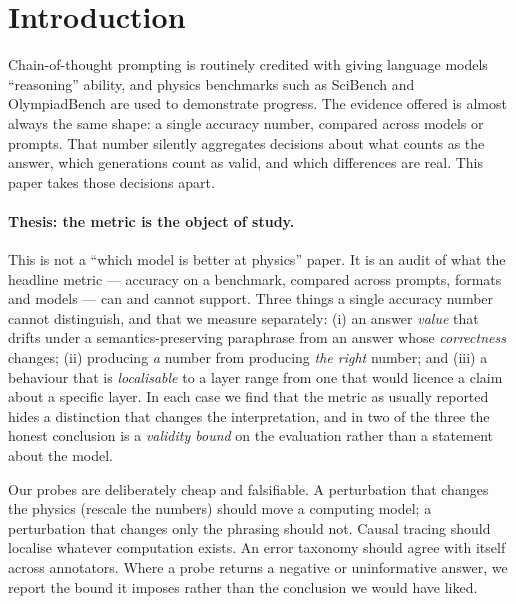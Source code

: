 \documentclass[10pt,letterpaper]{article}
\begin{document}
\section{Introduction}
\label{sec:intro}

Chain-of-thought prompting \citep{wei2022cot} is routinely credited with giving
language models ``reasoning'' ability, and physics benchmarks such as SciBench
\citep{wang2023scibench} and OlympiadBench \citep{he2024olympiadbench} are used to
demonstrate progress. The evidence offered is almost always the same shape: a
single accuracy number, compared across models or prompts. That number silently
aggregates decisions about what counts as the answer, which generations count as
valid, and which differences are real. This paper takes those decisions apart.

\paragraph{Thesis: the metric is the object of study.}
This is not a ``which model is better at physics'' paper. It is an audit of what
the headline metric --- accuracy on a benchmark, compared across prompts, formats
and models --- can and cannot support. Three things a single accuracy number
cannot distinguish, and that we measure separately:
(i) an answer \emph{value} that drifts under a semantics-preserving paraphrase from
an answer whose \emph{correctness} changes; (ii) producing \emph{a} number from
producing \emph{the right} number; and (iii) a behaviour that is
\emph{localisable} to a layer range from one that would licence a claim about a
specific layer. In each case we find that the metric as usually reported hides a
distinction that changes the interpretation, and in two of the three the honest
conclusion is a \emph{validity bound} on the evaluation rather than a statement
about the model.

Our probes are deliberately cheap and falsifiable. A perturbation that changes the
physics (rescale the numbers) should move a computing model; a perturbation that
changes only the phrasing should not. Causal tracing should localise whatever
computation exists. An error taxonomy should agree with itself across annotators.
Where a probe returns a negative or uninformative answer, we report the bound it
imposes rather than the conclusion we would have liked.
\end{document}
